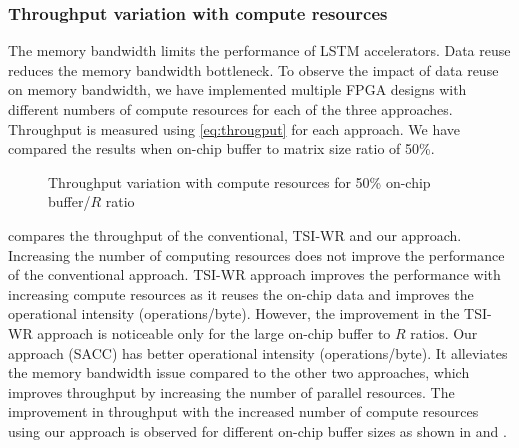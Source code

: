 {{{{\subsubsection{Throughput variation with compute resources}
The memory bandwidth limits the performance of LSTM accelerators. Data reuse reduces the memory bandwidth bottleneck. To observe the impact of data reuse on memory bandwidth, we have implemented multiple FPGA designs with different numbers of compute resources for each of the three approaches. Throughput is measured using \eqref{eq:througput} for each approach. We have compared the results when on-chip buffer to matrix size ratio of 50\%. 
\begin{figure}[htb!]
	\centering
	\hspace{2.0em}
	\caption{Throughput variation with compute resources for 50\% on-chip buffer/$R$ ratio}	\label{fig:throughputVsPF}
\end{figure}

 compares the throughput of the conventional, TSI-WR and our approach. 
Increasing the number of computing resources does not improve the performance of the conventional approach. TSI-WR approach improves the performance with increasing compute resources as it reuses the on-chip data and improves the operational intensity (operations/byte). However, the improvement in the TSI-WR approach is noticeable only for the large on-chip buffer to $R$ ratios. Our approach (SACC) has better operational intensity (operations/byte). It alleviates the memory bandwidth issue compared to the other two approaches, which improves throughput by increasing the number of parallel resources. The improvement in throughput with the increased number of compute resources using our approach is observed for different on-chip buffer sizes as shown in  and .
}}}}
